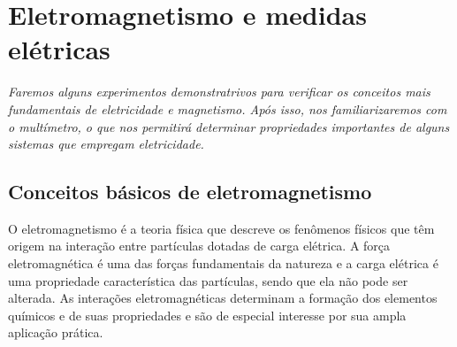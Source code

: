 \chapter{Eletromagnetismo e medidas elétricas} %
\label{Chap:EletEMedidas}        %

\begin{fullwidth}\it
	Faremos alguns experimentos demonstratrivos para verificar os conceitos mais fundamentais de eletricidade e magnetismo. Após isso, nos familiarizaremos com o multímetro, o que nos permitirá determinar propriedades importantes de alguns sistemas que empregam eletricidade.
\end{fullwidth}

\section{Conceitos básicos de eletromagnetismo}

O eletromagnetismo é a teoria física que descreve os fenômenos físicos que têm origem na interação entre partículas dotadas de carga elétrica. A força eletromagnética é uma das forças fundamentais da natureza e a carga elétrica é uma propriedade característica das partículas, sendo que ela não pode ser alterada. As interações eletromagnéticas determinam a formação dos elementos químicos e de suas propriedades e são de especial interesse por sua ampla aplicação prática.

